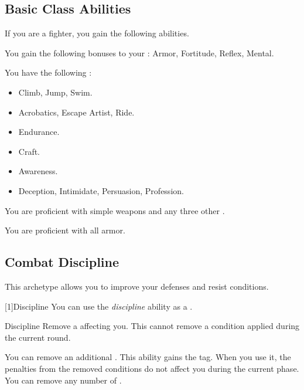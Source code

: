     \subsection{Basic Class Abilities}
        If you are a fighter, you gain the following abilities.

        You gain the following bonuses to your :  Armor,  Fortitude,  Reflex,  Mental.

        You have the following :
        \begin{itemize}
            \item {} Climb, Jump, Swim.
            \item {} Acrobatics, Escape Artist, Ride.
            \item {} Endurance.
            \item {} Craft.
            \item {} Awareness.
            \item {} Deception, Intimidate, Persuasion, Profession.
        \end{itemize}

        You are proficient with simple weapons and any three other .

        You are proficient with all armor.

    \subsection{Combat Discipline}
        This archetype allows you to improve your defenses and resist conditions.

        [1]{Discipline} You can use the \textit{discipline} ability as a .
        \begin{freeability}{Discipline}
            Remove a  affecting you.
            This cannot remove a condition applied during the current round.

            \rankline
             You can remove an additional .
             This ability gains the  tag.
            When you use it, the penalties from the removed conditions do not affect you during the current phase.
             You can remove any number of .
        \end{freeability}

